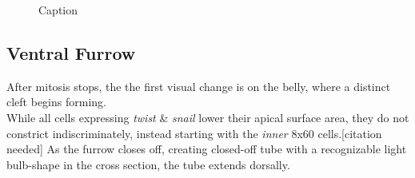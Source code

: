 \begin{figure}[H]
    \centering
    \vspace*{-1cm}\hspace*{-1cm}
    \caption{Caption}
    \label{fig:enter-label}
\end{figure}
\newpage

\subsection{Ventral Furrow}
After mitosis stops, the the first visual change is on the belly, where a distinct cleft begins forming. \\

While all cells expressing \textit{twist} \& \textit{snail} lower their apical surface area, they do not constrict indiscriminately, instead starting with the \textit{inner} 8x60 cells.[citation needed] As the furrow closes off, creating closed-off tube with a recognizable light bulb-shape in the cross section, the tube extends dorsally.

